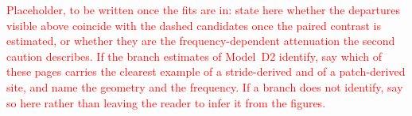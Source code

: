 \textcolor{red}{Placeholder, to be written once the fits are in: state here whether the departures
visible above coincide with the dashed candidates once the paired contrast is estimated, or whether
they are the frequency-dependent attenuation the second caution describes. If the branch estimates
of Model~D2 identify, say which of these pages carries the clearest example of a stride-derived and
of a patch-derived site, and name the geometry and the frequency. If a branch does not identify,
say so here rather than leaving the reader to infer it from the figures.}
